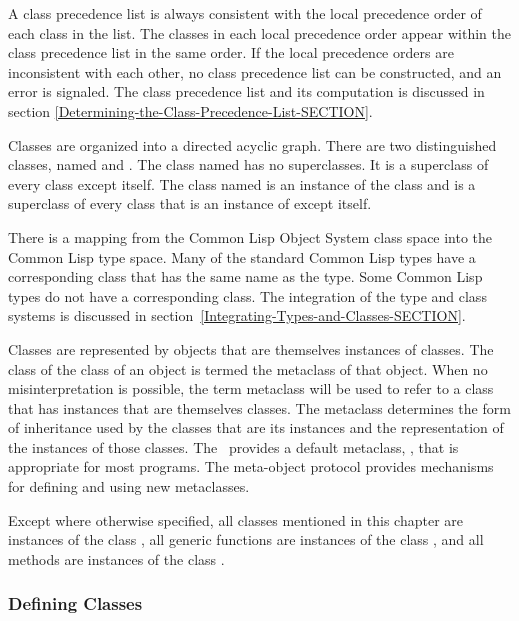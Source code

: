 A class precedence list is always consistent with the local precedence
order of each class in the list.  The classes in each local precedence
order appear within the class precedence list in the same order.  If
the local precedence orders are inconsistent with each other, no class
precedence list can be constructed, and an error is signaled.
The class precedence list and its computation is discussed
in section \ref{Determining-the-Class-Precedence-List-SECTION}.

Classes are organized into a {\bit directed acyclic graph}.  There are
two distinguished classes, named  and .
The class named  has no superclasses.  It is a superclass of
every class except itself.  The class named  is
an instance of the class  and is a superclass of
every class that is an instance of  except itself.

There is a mapping from the Common Lisp Object System class space into
the Common Lisp type space.  Many of the standard Common Lisp types
have a corresponding
class that has the same name as the type.  Some Common Lisp types do
not have a corresponding class.  The integration of the type and class
systems is discussed in section~\ref{Integrating-Types-and-Classes-SECTION}.

Classes are represented by objects that are themselves
instances of classes.  The class of the class of an object is termed
the {\bit metaclass\/} of that object.  When no misinterpretation is
possible, the term {\bit metaclass\/} will be used to refer to a class
that has instances that are themselves classes.  The metaclass
determines the form of inheritance used by the classes that are its
instances and the representation of the instances of those classes.
The \CLOS\ provides a default metaclass, , that is
appropriate for most programs.  The meta-object protocol provides
mechanisms for defining and using new metaclasses.

Except where otherwise specified, all classes mentioned in this
chapter are instances of the class , all generic
functions are instances of the class ,
and all methods are instances of the class .

\subsubsection{Defining Classes}

